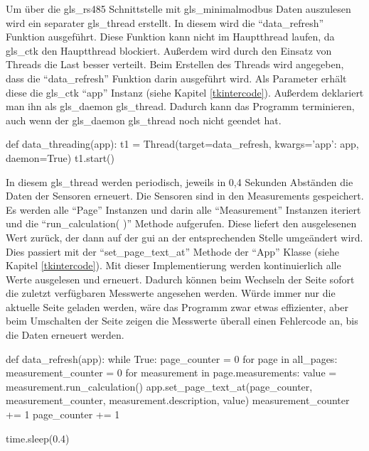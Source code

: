 \label{auslesen_rlt_parameter}

Um über die \gls{gls_rs485} Schnittstelle mit \gls{gls_minimalmodbus} Daten auszulesen wird ein separater \gls{gls_thread} erstellt. In diesem wird die \enquote{data\_refresh} Funktion ausgeführt. Diese Funktion kann nicht im Hauptthread laufen, da \gls{gls_ctk} den Hauptthread blockiert. Außerdem wird durch den Einsatz von Threads die Last besser verteilt. Beim Erstellen des Threads wird angegeben, dass die \enquote{data\_refresh} Funktion darin ausgeführt wird. Als Parameter erhält diese die \gls{gls_ctk} \enquote{app} Instanz (siehe Kapitel  \ref{tkintercode}). Außerdem deklariert man ihn als \gls{gls_daemon} \gls{gls_thread}. Dadurch kann das Programm terminieren, auch wenn der \gls{gls_daemon} \gls{gls_thread} noch nicht geendet hat.

\begin{pythoncode}
def data_threading(app):
	t1 = Thread(target=data_refresh, kwargs={'app': app}, daemon=True)
	t1.start()
\end{pythoncode}

In diesem \gls{gls_thread} werden periodisch, jeweils in 0,4 Sekunden Abständen die Daten der Sensoren erneuert. Die Sensoren sind in den Measurements gespeichert. Es werden alle \enquote{Page} Instanzen und darin alle \enquote{Measurement} Instanzen iteriert und die \enquote{run\_calculation( )} Methode aufgerufen. Diese liefert den ausgelesenen Wert zurück, der dann auf der \acs{gui} an der entsprechenden Stelle umgeändert wird. Dies passiert mit der \enquote{set\_page\_text\_at} Methode der \enquote{App} Klasse (siehe Kapitel \ref{tkintercode}). \newline Mit dieser Implementierung werden kontinuierlich alle Werte ausgelesen und erneuert. Dadurch können beim Wechseln der Seite sofort die zuletzt verfügbaren Messwerte angesehen werden. Würde immer nur die aktuelle Seite geladen werden, wäre das Programm zwar etwas effizienter, aber beim Umschalten der Seite zeigen die Messwerte überall einen Fehlercode an, bis die Daten erneuert werden. 

\begin{pythoncode}
def data_refresh(app):
	while True:
		page_counter = 0
		for page in all_pages:
			measurement_counter = 0
			for measurement in page.measurements:
				value = measurement.run_calculation()
				app.set_page_text_at(page_counter, measurement_counter, measurement.description, value)
				measurement_counter += 1
			page_counter += 1
		
		time.sleep(0.4)
\end{pythoncode}

